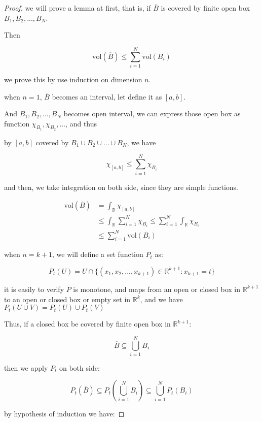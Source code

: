 \begin{proof}

    we will prove a lemma at first, that is, if $\overline{B}$ is covered by
    finite open box $B_1, B_2, ..., B_N$.

    Then

    \[
    \mathrm{vol}(\overline{B}) \le \sum_{i=1}^{N} \mathrm{vol}(B_i) 
    \]

    we prove this by use induction on dimension $n$.

    when $n=1$, $\overline{B}$ becomes an interval, let define it as $[a,b]$.

    And $B_1,B_2,...,B_N$ becomes open interval, we can express those open
    box as function $\chi_{B_1},\chi_{B_2},...$, and thus

    by $[a,b]$ covered by $B_1 \cup B_2 \cup ... \cup B_N$, we have

    \[
        \chi_{[a,b]} \le \sum_{i=1}^{N} \chi_{B_i}
    \]

    and then, we take integration on both side, since they are simple functions.

    \begin{align*}
        \mathrm{vol}(\overline{B}) &= \int_{\mathbb{R}} \chi_{[a,b]} \\
        & \le \int_{\mathbb{R}} \sum_{i=1}^{N} \chi_{B_i} \le  \sum_{i=1}^{N} \int_{\mathbb{R}} \chi_{B_i} \\
        & \le \sum_{i=1}^{N} \mathrm{vol}(B_i)
    \end{align*}


    when $n=k+1$, we will define a set function $P_t$ as:

    \[
        P_t(U) = U \cap \{ (x_1,x_2,...,x_{k+1}) \in \mathbb{R}^{k+1}: x_{k+1} = t\}
    \]

    it is easily to verify $P$ is monotone, and maps from an open or closed box in $\mathbb{R}^{k+1}$ to an open or closed box or empty set in $\mathbb{R}^k$, and we have $P_t(U \cup V) = P_t(U) \cup P_t(V)$

    Thus, if a closed box be covered by finite open box in $\mathbb{R}^{k+1}$:

    \[
        \overline{B} \subseteq \bigcup_{i=1}^{N} B_i
    \]

    then we apply $P_t$ on both side:


    \[
        P_t(\overline{B}) \subseteq P_t\left(\bigcup_{i=1}^{N} B_i\right) \subseteq \bigcup_{i=1}^{N}P_t(B_i)
    \]

    by hypothesis of induction we have:


\end{proof}
